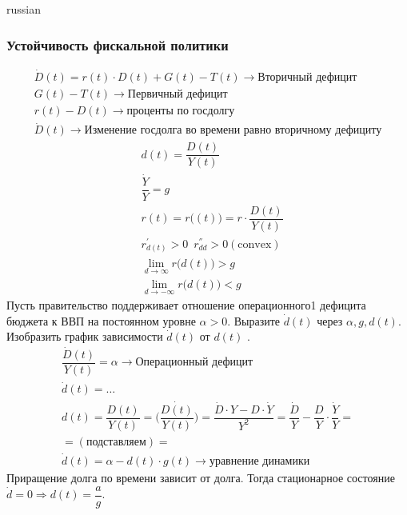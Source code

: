 \documentclass{article}
\begin{document}
\begin{otherlanguage*}{russian}
\begin{enumerate}
\subsubsection*{Устойчивость фискальной политики}
\begin{align*}
\dot D (t) = r (t) \cdot D(t) + G(t) - T(t) \rightarrow \text{Вторичный дефицит}\\
G(t) - T(t) \rightarrow \text{Первичный дефицит} \\
r(t) - D(t) \rightarrow \text{проценты по госдолгу} \\ 
\dot D(t) \rightarrow \text{Изменение госдолга во времени равно вторичному дефициту}
\end{align*}
\begin{align*}
&  d(t) = \dfrac{D(t) }{Y(t) } \\
& \dfrac{\dot Y}{Y} = g \\
& r(t) = r \Big( (t) \Big) = r \cdot \dfrac{D(t) }{Y(t) } \\
& r^{'}_{d(t)} > 0  \,\,\, r^{''}_{dd} > 0 ( \text{convex}) \\
& \lim_{d \rightarrow \infty}  r \Big( d(t) \Big) > g \\
& \lim_{d \rightarrow - \infty}  r \Big( d(t) \Big) < g 
\end{align*}
Пусть правительство поддерживает отношение операционного1 дефицита бюджета к
ВВП на постоянном уровне $ \alpha >  0$. Выразите $ \dot d (t) $ через $ \alpha, g, d(t) $. Изобразить график зависимости $ \dot d (t) $ от $ d(t) $ . 
\begin{align*}
\dfrac{\dot D(t) }{Y(t)} = \alpha \rightarrow \text{Операционный дефицит} \\
\dot d (t) = \ldots \\
d(t) = \dfrac{D(t)}{Y(t)} = \dot{\Big( \dfrac{D(t)}{Y(t) }\Big) } = \dfrac{\dot D \cdot Y - D \cdot \dot Y }{Y^2} = \dfrac{\dot D }{Y}  - \dfrac{D}{Y} \cdot \dfrac{\dot Y}{Y} = \\
=  (\text{подставляем}) = \\
\dot d (t) = \alpha - d(t) \cdot g (t) \rightarrow \text{уравнение динамики} 
\end{align*}
Приращение долга по времени зависит от долга. Тогда стационарное состояние $ \dot d = 0 \Rightarrow d(t) =  \dfrac{a}{g} $.
\end{enumerate}
\end{otherlanguage*} 
\end{document}
